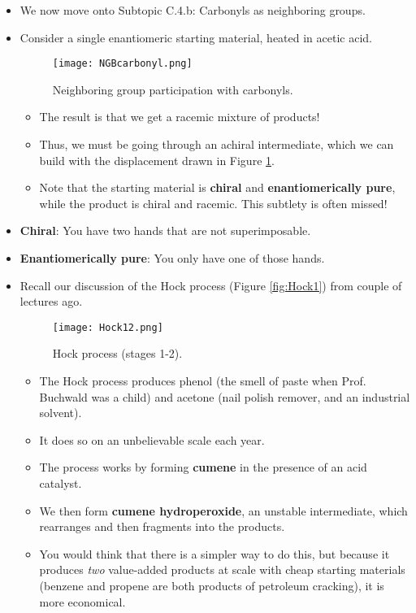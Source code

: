 \documentclass[../notes.tex]{subfiles}
\begin{document}
\begin{itemize}
\begin{itemize}
\begin{itemize}
        \end{itemize}
    \end{itemize}
    \item We now move onto Subtopic C.4.b{}: Carbonyls as neighboring groups.
    \item Consider a single enantiomeric starting material, heated in acetic acid.
    \begin{figure}[h!]
        \centering
        \texttt{[image: NGBcarbonyl.png]}
        \caption{Neighboring group participation with carbonyls.}
        \label{fig:NGBcarbonyl}
    \end{figure}
    \begin{itemize}
        \item The result is that we get a racemic mixture of products!
        \item Thus, we must be going through an achiral intermediate, which we can build with the displacement drawn in Figure \ref{fig:NGBcarbonyl}.
        \item Note that the starting material is \textbf{chiral} and \textbf{enantiomerically pure}, while the product is chiral and racemic. This subtlety is often missed!
    \end{itemize}
    \item \textbf{Chiral}: You have two hands that are not superimposable.
    \item \textbf{Enantiomerically pure}: You only have one of those hands.
    \item Recall our discussion of the Hock process (Figure \ref{fig:Hock1}) from couple of lectures ago.
    \begin{figure}[h!]
        \centering
        \texttt{[image: Hock12.png]}
        \caption{Hock process (stages 1-2).}
        \label{fig:Hock12}
    \end{figure}
    \begin{itemize}
        \item The Hock process produces phenol (the smell of paste when Prof. Buchwald was a child) and acetone (nail polish remover, and an industrial solvent).
        \item It does so on an unbelievable scale each year.
        \item The process works by forming \textbf{cumene} in the presence of an acid catalyst.
        \item We then form \textbf{cumene hydroperoxide}, an unstable intermediate, which rearranges and then fragments into the products.
        \item You would think that there is a simpler way to do this, but because it produces \emph{two} value-added products at scale with cheap starting materials (benzene and propene are both products of petroleum cracking), it is more economical.
    \end{itemize}
\end{itemize}
\end{document}
